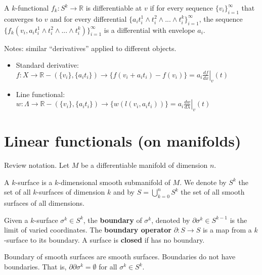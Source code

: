 \documentclass[11pt,letterpaper,fleqn]{memoir}
\begin{document}
\begin{defn}
	A $k$-functional $f_k : S^k \to \mathbb{R}$ is differentiable at $v$ if for every sequence $\{v_i\}_{i=1}^{\infty}$ that converges to $v$ and for every differential $\{a_i {t}^1_i \wedge {t}^2_i \wedge ... \wedge {t}^k_i \}_{i=1}^{\infty}$, the sequence $\{f_k(v_i, a_i {t}^1_i \wedge {t}^2_i \wedge ... \wedge {t}^k_i) \}_{i=1}^{\infty}$ is a differential with envelope $a_i$.
\end{defn}

Notes: similar ``derivatives'' applied to different objects.
\begin{itemize}
	\item Standard derivative: $f : X \to \mathbb{R} - (\{v_i\}, \{a_i t_i\}) \to \{f(v_i +a_i t_i) - f(v_i)\} = a_i \left. \frac{df}{dx} \right|_{v}(t)$
	\item Line functional: $w : \Lambda \to \mathbb{R} - (\{v_i\}, \{a_i t_i\}) \to \{w(l(v_i, a_i t_i))\} = a_i \left. \frac{dw}{d\lambda} \right|_{v}(t)$
\end{itemize}

\section{Linear functionals (on manifolds)}

Review notation. Let $M$ be a differentiable manifold of dimension $n$.

\begin{defn}
	A $k$-surface is a $k$-dimensional smooth submanifold of $M$. We denote by $S^k$ the set of all  $k$-surfaces of dimension $k$ and by $S = \bigcup_{k=0}^n S^k$ the set of all smooth surfaces of all dimensions.
\end{defn}

\begin{defn}
	Given a $k$-surface $\sigma^k \in S^k$, the \textbf{boundary} of $\sigma^k$, denoted by $\partial\sigma^k \in S^{k-1}$ is the limit of varied coordinates. The \textbf{boundary operator} $\partial : S \to S$ is a map from a $k$-surface to its boundary. A surface is \textbf{closed} if has no boundary.
\end{defn}

\begin{coro}
	Boundary of smooth surfaces are smooth surfaces. Boundaries do not have boundaries. That is, $\partial\partial \sigma^k = \emptyset$ for all $\sigma^k \in S^k$.
\end{coro}
\end{document}
